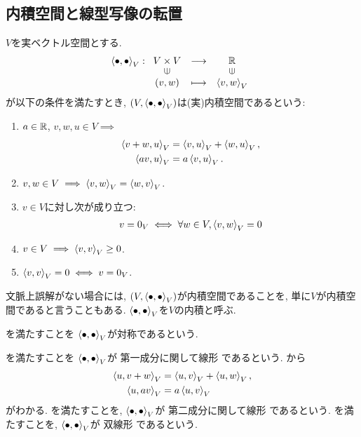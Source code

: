 \subsection{内積空間と線型写像の転置}
\begin{definition}
  $V$を実ベクトル空間とする.
  \begin{align*}
    \Braket{\bullet,\bullet}_V\colon
    \Shazo{V\times V}{\RR}
          {(v,w)}{\Braket{v,w}_V}
  \end{align*}
  が以下の条件を満たすとき,
  $(V,\Braket{\bullet,\bullet}_V)$は(実)内積空間であるという:
  \begin{enumerate}
  \item
    \label{def:inner:item:line}
    $a\in\mathbb{R}$, $v,w,u\in V\implies$
    \begin{align}
      \Braket{v+w,u}_V&=\Braket{v,u}_V+\Braket{w,u}_V,
      \label{def:inner:item:line:1:sum}
      \\
      \Braket{av,u}_V&=a\Braket{v,u}_V.
      \label{def:inner:item:line:1:sca}
    \end{align}
  \item
    \label{def:inner:item:sym}
    $v,w\in V \implies \Braket{v,w}_V=\Braket{w,v}_V$.
  \item 
    \label{def:inner:item:nondege}
    $v\in V$に対し次が成り立つ:
    \begin{align}
      v=0_V
      \iff
      \forall w\in V,\Braket{v,w}_V=0
      \label{def:inner:item:nondege:1}
    \end{align}
  \item
    \label{def:inner:item:semi}
    $v\in V \implies \Braket{v,v}_V\geq 0$.
  \item
    \label{def:inner:item:posi}
    $\Braket{v,v}_V=0\iff v=0_V$.
  \end{enumerate}
\end{definition}
\begin{remark}
  文脈上誤解がない場合には,
  $(V,\Braket{\bullet,\bullet}_V)$が内積空間であることを,
  単に$V$が内積空間であると言うこともある.
  $\Braket{\bullet,\bullet}_V$を$V$の内積と呼ぶ.
\end{remark}
\begin{remark}
  を満たすことを
  $\Braket{\bullet,\bullet}_V$が対称であるという.
\end{remark}
\begin{remark}
  を満たすことを
  $\Braket{\bullet,\bullet}_V$が
  第一成分に関して線形
  であるという.
  から
  \begin{align}
    \Braket{u,v+w}_V&=\Braket{u,v}_V+\Braket{u,w}_V,
    \label{def:inner:item:line:2:sum}
    \\
    \Braket{u,av}_V&=a\Braket{u,v}_V    
    \label{def:inner:item:line:2:sca}
  \end{align}
  がわかる.
  を満たすことを,
  $\Braket{\bullet,\bullet}_V$が
  第二成分に関して線形
  であるという.
  を満たすことを,
  $\Braket{\bullet,\bullet}_V$が
  双線形
  であるという.
\end{remark}
